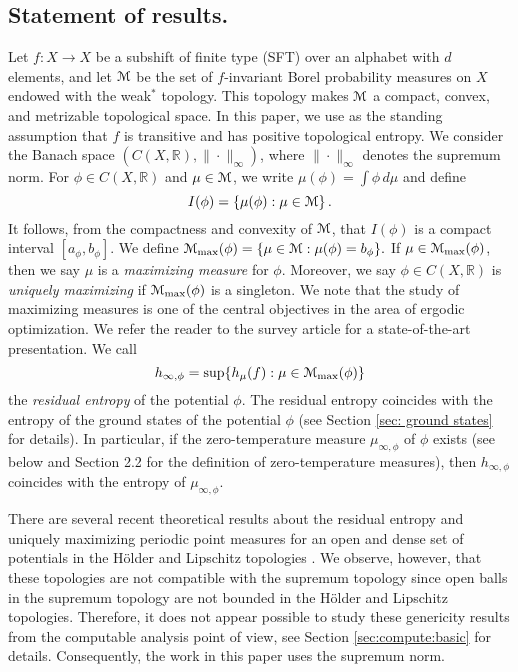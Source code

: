 \documentclass[11pt, reqno]{amsart}
\newcommand{\cM}{\EuScript{M}}
\newcommand{\bR}{{\mathbb R}}
\begin{document}
\subsection{Statement of results.}\label{sec:results}  Let $f:X\to X$ be a  subshift of finite type (SFT) over an alphabet with $d$ elements, and  let $\cM$ be the set of $f$-invariant Borel probability measures on $X$ endowed with the weak$^\ast$ topology.  This topology makes  $\cM$ a  compact, convex, and metrizable topological space.  
In this paper, we use as the standing assumption that $f$ is transitive and has positive topological entropy.
We consider
 the Banach space $(C(X, \bR),\|\cdot\|_\infty)$,  where $\|\cdot\|_\infty$ denotes the supremum norm.
For  $\phi\in C(X,\bR)$ and $\mu\in\cM$, we write
$\mu(\phi)=\int \phi\, d\mu$ and define
$$
I(\phi)=\left\{\mu(\phi): \mu \in \cM\right\}.
$$
It follows, from the compactness and convexity of $\cM$, that $I(\phi)$ is a compact interval $[a_\phi,b_\phi]$. We define $\cM_{\max}(\phi)=\{\mu\in \cM: \mu(\phi)=b_\phi\}.$
If $\mu\in \cM_{\max}(\phi)$, then we say $\mu$ is a {\em maximizing measure} for $\phi$. Moreover, we say $\phi\in C(X,\bR)$ is {\em uniquely maximizing} if $\cM_{\max}(\phi)$ is a singleton. 
We note that the study of maximizing measures is one of the central objectives in the area of ergodic optimization. We refer the reader to the survey article \cite{Je2} for a state-of-the-art presentation. 
We call 
$$
h_{\infty,\phi} =\sup\{h_\mu(f): \mu\in \cM_{\max}(\phi)\}
$$
 the {\em residual entropy} of the potential $\phi$. The residual entropy coincides with the entropy of the ground states of the potential $\phi$ (see  Section   \ref{sec: ground states} for details). In particular, if the zero-temperature measure $\mu_{\infty,\phi}$ of $\phi$ exists (see below and Section 2.2 for the definition of zero-temperature measures), then $h_{\infty,\phi}$ coincides with the entropy of $\mu_{\infty,\phi}$.
 
There are several recent theoretical results about the residual entropy and uniquely maximizing periodic point measures for an open and dense set of potentials in the H\"older and Lipschitz topologies \cite{C,CLT,M,QS}.  We observe, however, that these topologies are not compatible with the supremum topology since open balls in the supremum topology are not bounded in the H\"older and Lipschitz topologies.  Therefore, it does not appear possible to study these genericity results from the computable analysis point of view, see Section \ref{sec:compute:basic} for details.  Consequently, the work in this paper uses the supremum norm.
\end{document}
